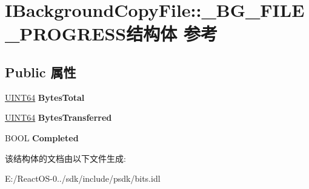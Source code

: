 \hypertarget{struct_i_background_copy_file_1_1___b_g___f_i_l_e___p_r_o_g_r_e_s_s}{}\section{I\+Background\+Copy\+File\+:\+:\+\_\+\+B\+G\+\_\+\+F\+I\+L\+E\+\_\+\+P\+R\+O\+G\+R\+E\+S\+S结构体 参考}
\label{struct_i_background_copy_file_1_1___b_g___f_i_l_e___p_r_o_g_r_e_s_s}
\subsection*{Public 属性}
\begin{DoxyCompactItemize}
\item 
\mbox{\label{struct_i_background_copy_file_1_1___b_g___f_i_l_e___p_r_o_g_r_e_s_s_a312a0e54cb08ba69a5fd4fff6e89078b}} 
\hyperlink{_processor_bind_8h_a57be03562867144161c1bfee95ca8f7c}{U\+I\+N\+T64} {\bfseries Bytes\+Total}
\item 
\mbox{\label{struct_i_background_copy_file_1_1___b_g___f_i_l_e___p_r_o_g_r_e_s_s_a42b2dd55fb3b192eed5a9d30bd5e2a19}} 
\hyperlink{_processor_bind_8h_a57be03562867144161c1bfee95ca8f7c}{U\+I\+N\+T64} {\bfseries Bytes\+Transferred}
\item 
\mbox{\label{struct_i_background_copy_file_1_1___b_g___f_i_l_e___p_r_o_g_r_e_s_s_ab41edc47741d77f3101ca3395ac5ad59}} 
B\+O\+OL {\bfseries Completed}
\end{DoxyCompactItemize}


该结构体的文档由以下文件生成\+:\begin{DoxyCompactItemize}
\item 
E\+:/\+React\+O\+S-\/0../sdk/include/psdk/bits.\+idl\end{DoxyCompactItemize}
